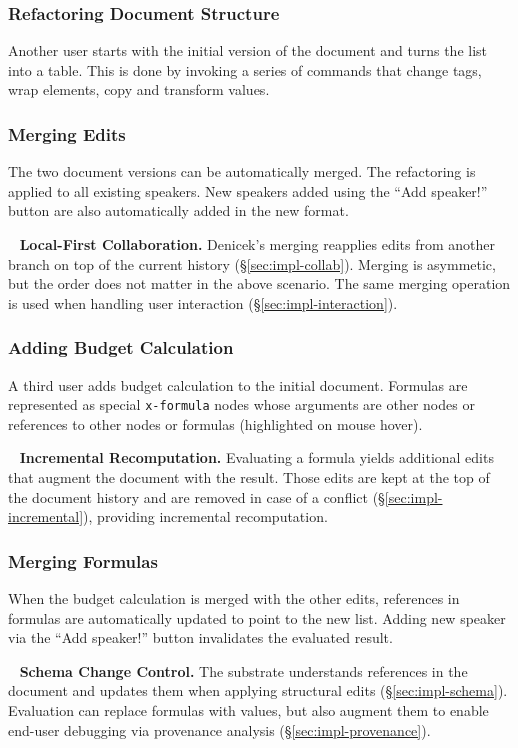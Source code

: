 \documentclass[sigconf,anonymous,screen]{acmart}
\newcommand*\circled[1]{\textnormal{\footnotesize\sffamily\bfseries\protect\tikz[baseline=(char.base)]{
  \node[shape=circle,fill=black,text=white,draw,inner sep=1pt] (char) {#1};}}}
\DeclareRobustCommand{\keyideabox}[3]{\begin{tcolorbox}[breakable,
  boxsep=5pt,left=0pt,right=0pt,top=0pt,bottom=0pt,width=\dimexpr\columnwidth\relax,
  colback=gray!20,colframe=gray!20,
  enlarge bottom by=0pt,enlarge top by=0pt,
  arc=0pt,outer arc=0pt]
\lettrine[lraise=0.3]{\LARGE #1}{~}
\small \textbf{#2.} #3
\end{tcolorbox}
}
\begin{document}
\subsubsection*{\circled{D} Refactoring Document Structure} Another user starts with the initial
version of the document and turns the list into a table. This is done by invoking a series of
commands that change tags, wrap elements, copy and transform values.

\subsubsection*{\circled{E} Merging Edits} The two document versions can be automatically merged.
The refactoring is applied to all existing speakers. New speakers added using the ``Add speaker!''
button are also automatically added in the new format.

\keyideabox{\faLightbulbO}{Local-First Collaboration}{Denicek's merging
reapplies edits from another branch on top of the current history (\S\ref{sec:impl-collab}).
Merging is asymmetic, but the order does not matter in the above scenario. The same merging
operation is used when handling user interaction (\S\ref{sec:impl-interaction}).}

\subsubsection*{\circled{F} Adding Budget Calculation} A third user adds budget calculation to
the initial document. Formulas are represented as special {\small\Verb_x-formula_} nodes whose arguments
are other nodes or references to other nodes or formulas (highlighted on mouse hover).

\keyideabox{\faLightbulbO}{Incremental Recomputation}{Evaluating a formula yields additional
edits that augment the document with the result. Those edits are kept
at the top of the document history and are removed in case of a conflict (\S\ref{sec:impl-incremental}),
providing incremental recomputation.}

\subsubsection*{\circled{G} Merging Formulas} When the budget calculation is merged with the
other edits, references in formulas are automatically updated to point to the new list.
Adding new speaker via the ``Add speaker!'' button invalidates the evaluated result.

\keyideabox{\faLightbulbO}{Schema Change Control}{The substrate understands references in
the document and updates them when applying structural edits (\S\ref{sec:impl-schema}).
Evaluation can replace formulas with values, but also augment them to enable
end-user debugging via provenance analysis (\S\ref{sec:impl-provenance}).}
\end{document}
